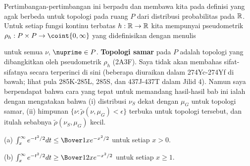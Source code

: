 { Pertimbangan-pertimbangan ini berpadu dan membawa
kita pada definisi yang agak berbeda untuk topologi pada ruang $P$ dari
distribusi probabilitas pada $\Bbb R$. Untuk setiap fungsi kontinu terbatas
$h:\Bbb R\to\Bbb R$ kita mempunyai pseudometrik
$\rho_h:P\times P\to\coint{0,\infty}$
yang didefinisikan dengan menulis


\noindent untuk semua $\nu$, $\nuprime\in P$. {\bf Topologi samar} pada $P$
adalah topologi yang dibangkitkan oleh pseudometrik $\rho_h$ (2A3F). Saya
tidak akan membahas sifat-sifatnya secara terperinci di sini (beberapa
diuraikan dalam 274Yc-274Yf %
di bawah; lihat pula 285K-285L, 285S, dan 437J-437T
dalam Jilid 4). Namun saya berpendapat bahwa cara yang tepat untuk memandang
hasil-hasil bab ini ialah dengan mengatakan bahwa (i) distribusi $\nu_S$
dekat dengan $\mu_G$ untuk topologi samar, (ii) himpunan
$\{\nu:\tilde\rho(\nu,\mu_G)<\epsilon\}$ terbuka untuk topologi tersebut,
dan itulah sebabnya $\tilde\rho(\nu_S,\mu_G)$ kecil.
}%

 (a)
$\int_x^{\infty}e^{-t^2/2}dt\le\Bover1xe^{-x^2/2}$ untuk setiap $x>0$.

(b) $\int_x^{\infty}e^{-t^2/2}dt\ge\Bover1{2x}e^{-x^2/2}$ untuk setiap
$x\ge 1$.


